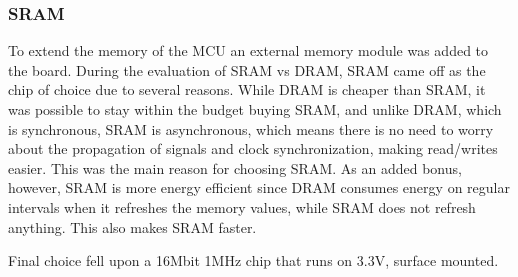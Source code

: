 
\subsubsection{SRAM}

To extend the memory of the MCU an external memory module was added to the board. During the evaluation of SRAM vs DRAM, SRAM came off as the chip of choice
due to several reasons. While DRAM is cheaper than SRAM, it was possible to stay
within the budget buying SRAM,
and unlike DRAM, which is synchronous, SRAM is asynchronous, which means there is no need to worry about the propagation of signals and clock synchronization, making read/writes easier. This was the main reason for choosing SRAM. As
an added bonus, however, SRAM is more energy efficient since DRAM consumes
energy on regular intervals when it refreshes the memory values, while SRAM does
not refresh anything. This also makes SRAM faster.

Final choice fell upon a 16Mbit 1MHz chip that runs on 3.3V, surface mounted.

